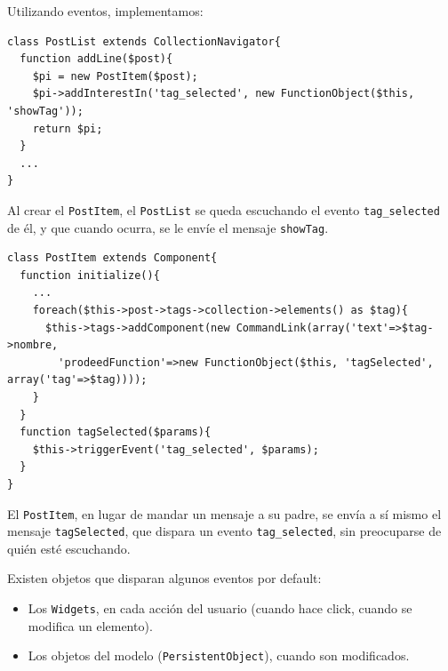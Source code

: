 Utilizando eventos, implementamos:

\begin{verbatim}
class PostList extends CollectionNavigator{
  function addLine($post){
    $pi = new PostItem($post);
    $pi->addInterestIn('tag_selected', new FunctionObject($this, 'showTag'));
    return $pi;
  }
  ...
}
\end{verbatim}

Al crear el \verb'PostItem', el \verb'PostList' se queda escuchando el evento \verb'tag_selected' de él, y que cuando ocurra, se le envíe el mensaje \verb'showTag'.

\begin{verbatim}
class PostItem extends Component{
  function initialize(){
    ...
    foreach($this->post->tags->collection->elements() as $tag){
      $this->tags->addComponent(new CommandLink(array('text'=>$tag->nombre,
        'prodeedFunction'=>new FunctionObject($this, 'tagSelected', array('tag'=>$tag))));
    }
  }
  function tagSelected($params){
    $this->triggerEvent('tag_selected', $params);
  }
}

\end{verbatim}

El \verb'PostItem', en lugar de mandar un mensaje a su padre, se envía a sí mismo el mensaje \verb'tagSelected', que dispara un evento \verb'tag_selected', sin preocuparse de quién esté escuchando.

Existen objetos que disparan algunos eventos por default:
\begin{itemize}
\item Los \verb"Widgets", en cada acción del usuario (cuando hace click, cuando se modifica un elemento).
\item Los objetos del modelo (\verb"PersistentObject"), cuando son modificados.
\end{itemize}



